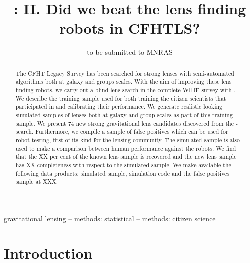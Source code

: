 \documentclass[useAMS,usenatbib,a4paper]{mn2e}
\title[\sw II]
{\SW: II. Did we beat the lens finding robots in CFHTLS?}
\author[More et al.]{%
 
}
\begin{document}
             
\date{to be submitted to MNRAS}
\pagerange{\pageref{firstpage}--\pageref{lastpage}}

\maketitle           

\label{firstpage}


\begin{abstract} 

The CFHT Legacy Survey has been searched for strong lenses with
semi-automated algorithms both at galaxy and groups scales. With the aim
of improving these lens finding robots, we carry out a blind lens search
in the complete \cfhtls WIDE survey with \sw. We describe the training
sample used for both training the citizen scientists that participated
in \sw and calibrating their performance. We generate realistic looking
simulated samples of lenses both at galaxy and group-scales as part of
this training sample. We present 74 new strong gravitational lens
candidates discovered from the \sw-\cfhtls search. Furthermore, we
compile a sample of false positives which can be used for robot testing,
first of its kind for the lensing community. The simulated sample is
also used to make a comparison between human performance against the
robots. We find that the XX per cent of the known lens sample is
recovered and the new lens sample has XX completeness with respect to
the simulated sample. We make available the following data products:
simulated sample, simulation code and the false positives sample at XXX.

\end{abstract}


\begin{keywords}
  gravitational lensing   --
  methods: statistical    --
  methods: citizen science
\end{keywords}

\setcounter{footnote}{1}


\section{Introduction}
\label{sec:intro}
\end{document}
